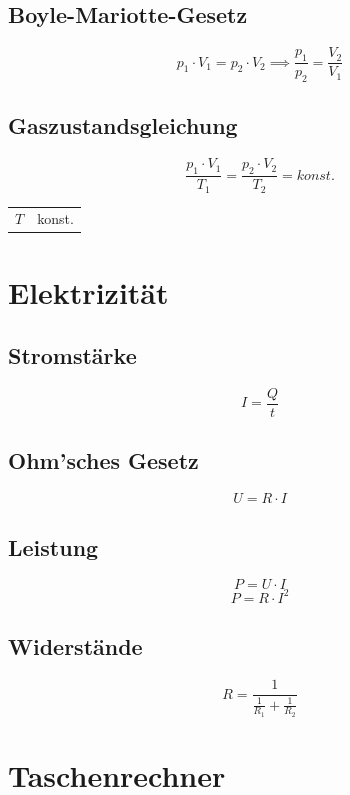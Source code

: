 \documentclass[a4paper]{IEEEtran}
\makeatletter
\newenvironment{conditions}
  {\par\vspace{\abovedisplayskip}\noindent\begin{tabular}{>{$}l<{$} @{${}={}$} l}}
  {\end{tabular}\par\vspace{\belowdisplayskip}}
\makeatother
\begin{document}
  \subsection{Boyle-Mariotte-Gesetz}
  \begin{equation}
    p_1 \cdot V_1 = p_2 \cdot V_2 \implies \frac{p_1}{p_2} = \frac{V_2}{V_1}
  \end{equation}
  \subsection{Gaszustandsgleichung}
  \begin{equation}
    \frac{p_1 \cdot V_1}{T_1} = \frac{p_2 \cdot V_2}{T_2} = konst.
  \end{equation}
  \begin{conditions}
    T & konst.
  \end{conditions}
  \section{Elektrizität}
  \subsection{Stromstärke}
  \begin{equation}
    I = \frac{Q}{t}
  \end{equation}
  \subsection{Ohm'sches Gesetz}
  \begin{equation}
    U = R \cdot I
  \end{equation}
  \subsection{Leistung}
  \begin{equation}
    P = U \cdot I
  \end{equation}
  \begin{equation}
    P = R \cdot I^2
  \end{equation}
  \subsection{Widerstände}
  \begin{equation}
    R = \frac{1}{\frac{1}{R_1} + \frac{1}{R_2}}
  \end{equation}
  \section{Taschenrechner}
\end{document}
